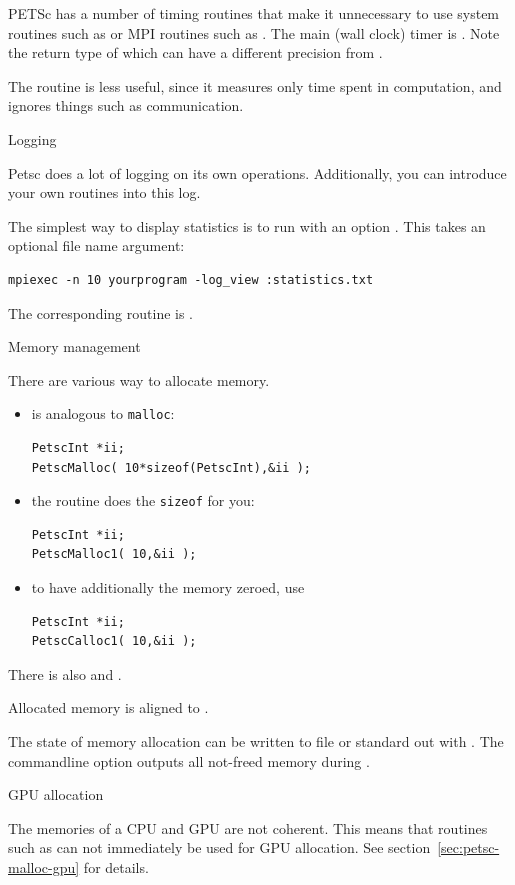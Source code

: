 PETSc has a number of timing routines that make it unnecessary to
use system routines such as 
or MPI routines such as .
The main (wall clock) timer is .
Note the return type of  which
can have a different precision from .

The routine  is less useful, since it measures only
time spent in computation, and ignores things such as communication.

 {Logging}

Petsc does a lot of logging on its own operations.
Additionally, you can introduce your own routines into this log.

The simplest way to display statistics is to run
with an option .
This takes an optional file name argument:
\begin{verbatim}
mpiexec -n 10 yourprogram -log_view :statistics.txt
\end{verbatim}
The corresponding routine is .

 {Memory management}
\label{sec:petscmalloc}

There are various way to allocate memory.
\begin{itemize}
\item {} is analogous to \lstinline{malloc}:
\begin{lstlisting}
PetscInt *ii;
PetscMalloc( 10*sizeof(PetscInt),&ii );
\end{lstlisting}
\item the routine  does the \lstinline{sizeof} for you:
\begin{lstlisting}
PetscInt *ii;
PetscMalloc1( 10,&ii );
\end{lstlisting}
\item to have additionally the memory zeroed, use 
\begin{lstlisting}
PetscInt *ii;
PetscCalloc1( 10,&ii );
\end{lstlisting}
\end{itemize}

There is also 
and .

Allocated memory is aligned to .

The state of memory allocation can be written to file or standard out
with .
%
The commandline option  outputs all
not-freed memory during .

 {GPU allocation}

The memories of a CPU and GPU are not coherent.
This means that routines such as 
can not immediately be used for GPU allocation.
See section~\ref{sec:petsc-malloc-gpu} for details.
